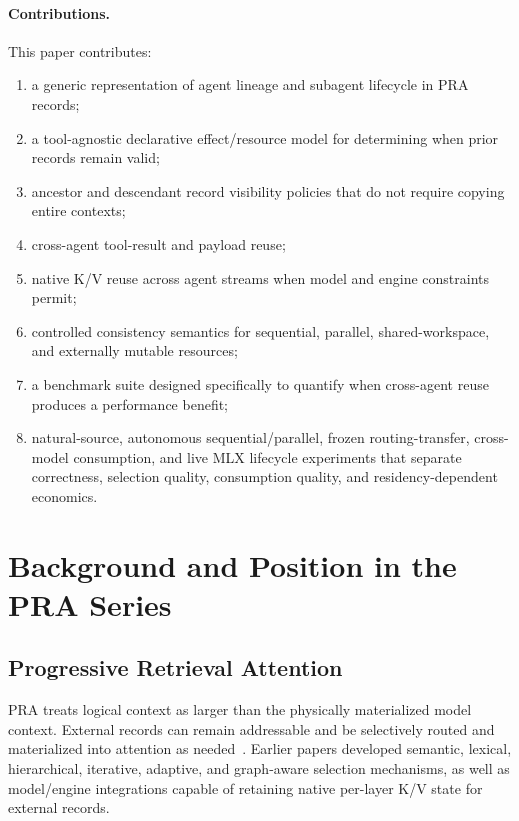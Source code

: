 \documentclass[11pt]{article}
\begin{document}
\paragraph{Contributions.}
This paper contributes:

\begin{enumerate}[leftmargin=*]
    \item a generic representation of agent lineage and subagent lifecycle in PRA records;
    \item a tool-agnostic declarative effect/resource model for determining when prior records remain valid;
    \item ancestor and descendant record visibility policies that do not require copying entire contexts;
    \item cross-agent tool-result and payload reuse;
    \item native K/V reuse across agent streams when model and engine constraints permit;
    \item controlled consistency semantics for sequential, parallel, shared-workspace, and externally mutable resources;
    \item a benchmark suite designed specifically to quantify when cross-agent reuse produces a performance benefit;
    \item natural-source, autonomous sequential/parallel, frozen routing-transfer,
    cross-model consumption, and live MLX lifecycle experiments that separate
    correctness, selection quality, consumption quality, and
    residency-dependent economics.
\end{enumerate}

\section{Background and Position in the PRA Series}

\subsection{Progressive Retrieval Attention}

PRA treats logical context as larger than the physically materialized model
context. External records can remain addressable and be selectively routed and
materialized into attention as needed~\cite{simao2026pra,simao2026hf}. Earlier
papers developed semantic, lexical, hierarchical, iterative, adaptive, and
graph-aware selection mechanisms, as well as model/engine integrations capable
of retaining native per-layer K/V state for external records.
\end{document}
